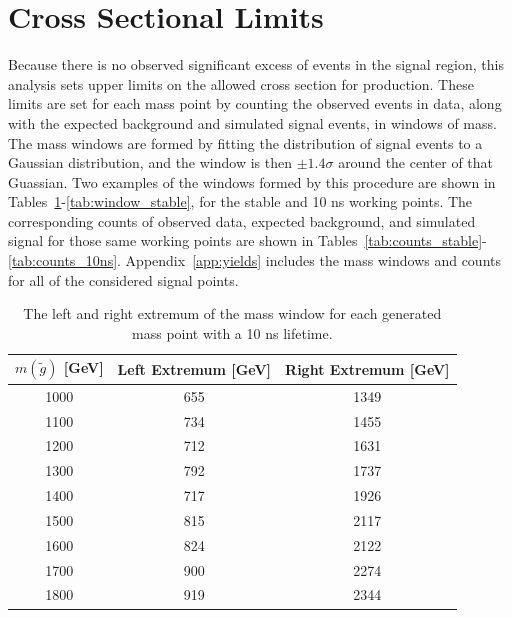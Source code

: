 
\section{Cross Sectional Limits}

Because there is no observed significant excess of events in the signal region, this analysis sets upper limits on the allowed cross section for \rhadron production.
These limits are set for each mass point by counting the observed events in data, along with the expected background and simulated signal events, in windows of mass.
The mass windows are formed by fitting the distribution of signal events to a Gaussian distribution, and the window is then $\pm 1.4\sigma$ around the center of that Guassian.
Two examples of the windows formed by this procedure are shown in Tables~\ref{tab:window_10ns}-\ref{tab:window_stable}, for the stable and 10 ns working points.
The corresponding counts of observed data, expected background, and simulated signal for those same working points are shown in Tables~\ref{tab:counts_stable}-\ref{tab:counts_10ns}.
Appendix~\ref{app:yields} includes the mass windows and counts for all of the considered signal points.

\begin{table}[!htbp]
  \begin{center}
    \begin{tabular}{ccc}
        \hline
        $m(\tilde{g})$ [GeV]  & Left Extremum [GeV] & Right Extremum [GeV] \\
        \hline
        1000    & 655 & 1349 \\
        1100    & 734 & 1455 \\
        1200    & 712 & 1631 \\
        1300    & 792 & 1737 \\
        1400    & 717 & 1926 \\
        1500    & 815 & 2117 \\
        1600    & 824 & 2122 \\
        1700    & 900 & 2274 \\
        1800    & 919 & 2344 \\
        \hline
    \end{tabular}
  \end{center}
  \caption{The left and right extremum of the mass window for each generated mass point with a 10 ns lifetime.}
  \label{tab:window_10ns}
\end{table}

